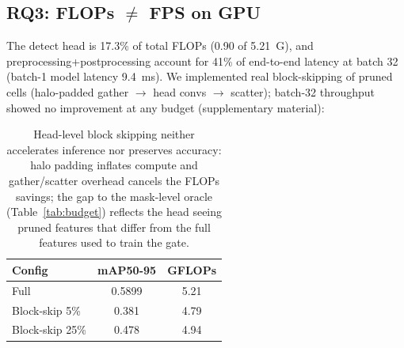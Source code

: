 \documentclass[3p]{elsarticle}
\begin{document}
\subsection{RQ3: FLOPs $\neq$ FPS on GPU}
The detect head is 17.3\% of total FLOPs (0.90 of 5.21~G), and preprocessing+postprocessing account for 41\% of end-to-end latency at batch 32 (batch-1 model latency 9.4~ms). We implemented real block-skipping of pruned cells (halo-padded gather $\to$ head convs $\to$ scatter); batch-32 throughput showed no improvement at any budget (supplementary material):
\begin{table}[h]\centering\footnotesize
\begin{tabular}{lcc}
\toprule
Config & mAP50-95 & GFLOPs\\
\midrule
Full & 0.5899 & 5.21\\
Block-skip 5\% & 0.381 & 4.79\\
Block-skip 25\% & 0.478 & 4.94\\
\bottomrule
\end{tabular}
\caption{Head-level block skipping neither accelerates inference nor preserves accuracy: halo padding inflates compute and gather/scatter overhead cancels the FLOPs savings; the gap to the mask-level oracle (Table~\ref{tab:budget}) reflects the head seeing pruned features that differ from the full features used to train the gate.}
\label{tab:blockskip}
\end{table}
\end{document}

